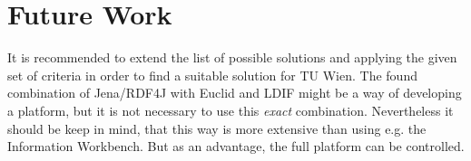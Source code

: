 \section{Future Work}

It is recommended to extend the list of possible solutions and applying the given set of criteria in order to find a suitable solution for TU Wien. The found combination of Jena/RDF4J with Euclid and LDIF might be a way of developing a platform, but it is not necessary to use this \emph{exact} combination. Nevertheless it should be keep in mind, that this way is more extensive than using e.g. the Information Workbench. But as an advantage, the full platform can be controlled.